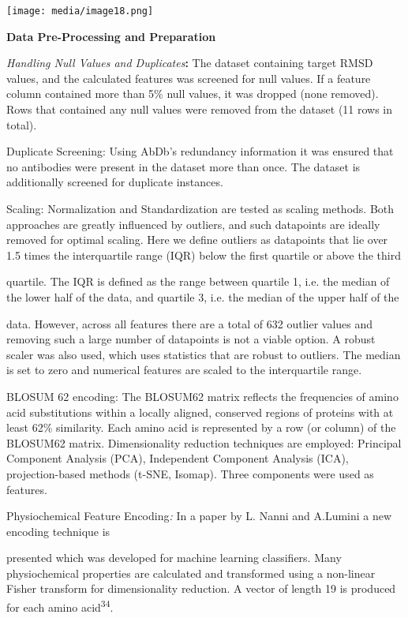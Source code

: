 \documentclass[
]{article}
\begin{document}
\texttt{[image: media/image18.png]}

\textbf{Data Pre-Processing and Preparation}

{\emph{Handling Null Values and Duplicates}\textbf{: }}The dataset
containing target RMSD values, and the calculated features was screened
for null values. If a feature column contained more than 5\% null
values, it was dropped (none removed). Rows that contained any null
values were removed from the dataset (11 rows in total).

{Duplicate Screening}: Using AbDb's redundancy information it was
ensured that no antibodies were present in the dataset more than once.
The dataset is additionally screened for duplicate instances.

{Scaling:} Normalization and Standardization are tested as scaling
methods. Both approaches are greatly influenced by outliers, and such
datapoints are ideally removed for optimal scaling. Here we define
outliers as datapoints that lie over 1.5 times the interquartile range
(IQR) below the first quartile or above the third

quartile. The IQR is defined as the range between quartile 1, i.e. the
median of the lower half of the data, and quartile 3, i.e. the median of
the upper half of the

data. However, across all features there are a total of 632 outlier
values and removing such a large number of datapoints is not a viable
option. A robust scaler was also used, which uses statistics that are
robust to outliers. The median is set to zero and numerical features are
scaled to the interquartile range.

{BLOSUM 62 encoding:} The BLOSUM62 matrix reflects the frequencies of
amino acid substitutions within a locally aligned, conserved regions of
proteins with at least 62\% similarity. Each amino acid is represented
by a row (or column) of the BLOSUM62 matrix. Dimensionality reduction
techniques are employed: Principal Component Analysis (PCA), Independent
Component Analysis (ICA), projection-based methods (t-SNE, Isomap).
Three components were used as features.

{Physiochemical Feature Encoding\emph{:}} In a paper by L. Nanni and
A.Lumini a new encoding technique is

presented which was developed for machine learning classifiers. Many
physiochemical properties are calculated and transformed using a
non-linear Fisher transform for dimensionality reduction. A vector of
length 19 is produced for each amino acid\textsuperscript{34}.
\end{document}
